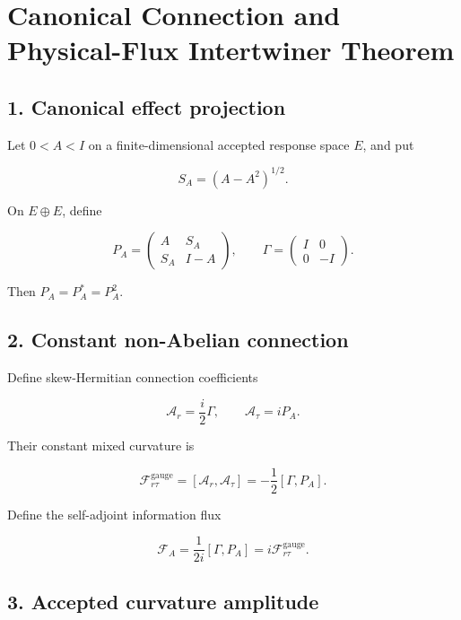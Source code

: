 \hypertarget{canonical-connection-and-physical-flux-intertwiner-theorem}{%
\chapter{Canonical Connection and Physical-Flux Intertwiner Theorem}\label{canonical-connection-and-physical-flux-intertwiner-theorem}}

\hypertarget{canonical-effect-projection}{%
\section{1. Canonical effect projection}\label{canonical-effect-projection}}

Let \(0<A<I\) on a finite-dimensional accepted response space \(E\), and put

\[
S_A=(A-A^2)^{1/2}.
\]

On \(E\oplus E\), define

\[
P_A=
\begin{pmatrix}
A&S_A\\
S_A&I-A
\end{pmatrix},
\qquad
\Gamma=
\begin{pmatrix}
I&0\\
0&-I
\end{pmatrix}.
\]

Then \(P_A=P_A^*=P_A^2\).

\hypertarget{constant-non-abelian-connection}{%
\section{2. Constant non-Abelian connection}\label{constant-non-abelian-connection}}

Define skew-Hermitian connection coefficients

\[
\mathcal A_r=\frac{i}{2}\Gamma,
\qquad
\mathcal A_\tau=iP_A.
\]

Their constant mixed curvature is

\[
\mathcal F_{r\tau}^{\mathrm{gauge}}
=[\mathcal A_r,\mathcal A_\tau]
=-\frac12[\Gamma,P_A].
\]

Define the self-adjoint information flux

\[
\boxed{
\mathcal F_A=\frac1{2i}[\Gamma,P_A]
=i\mathcal F_{r\tau}^{\mathrm{gauge}}.
}
\]

\hypertarget{accepted-curvature-amplitude}{%
\section{3. Accepted curvature amplitude}\label{accepted-curvature-amplitude}}

